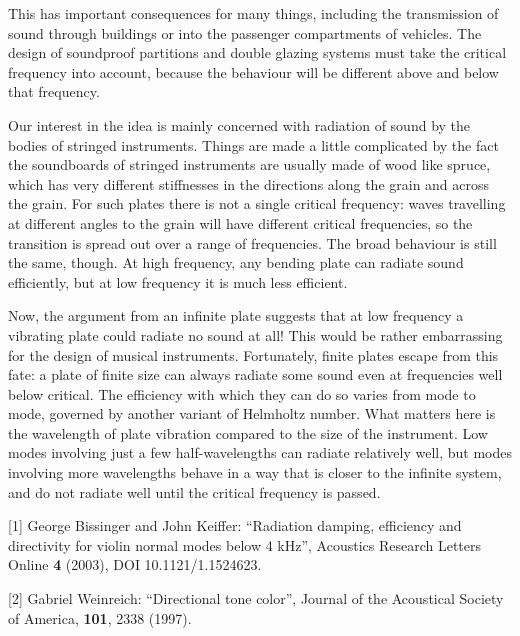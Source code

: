   This has important consequences for many things, including the transmission 
  of sound through buildings or into the passenger compartments of vehicles. 
  The design of soundproof partitions and double glazing systems must take the 
  critical frequency into account, because the behaviour will be different 
  above and below that frequency. 

  Our interest in the idea is mainly concerned with radiation of sound by the 
  bodies of stringed instruments. Things are made a little complicated by the 
  fact the soundboards of stringed instruments are usually made of wood like 
  spruce, which has very different stiffnesses in the directions along the 
  grain and across the grain. For such plates there is not a single critical 
  frequency: waves travelling at different angles to the grain will have 
  different critical frequencies, so the transition is spread out over a range 
  of frequencies. The broad behaviour is still the same, though. At high 
  frequency, any bending plate can radiate sound efficiently, but at low 
  frequency it is much less efficient. 

  Now, the argument from an infinite plate suggests that at low frequency a 
  vibrating plate could radiate no sound at all! This would be rather 
  embarrassing for the design of musical instruments. Fortunately, finite 
  plates escape from this fate: a plate of finite size can always radiate some 
  sound even at frequencies well below critical. The efficiency with which they 
  can do so varies from mode to mode, governed by another variant of Helmholtz 
  number. What matters here is the wavelength of plate vibration compared to 
  the size of the instrument. Low modes involving just a few half-wavelengths 
  can radiate relatively well, but modes involving more wavelengths behave in a 
  way that is closer to the infinite system, and do not radiate well until the 
  critical frequency is passed. 



  \sectionreferences{}[1] George Bissinger and John Keiffer: ``Radiation 
  damping, efficiency and directivity for violin normal modes below 4 kHz'', 
  Acoustics Research Letters Online \textbf{4} (2003), DOI 10.1121/1.1524623. 

  [2] Gabriel Weinreich: ``Directional tone color'', Journal of the Acoustical 
  Society of America, \textbf{101}, 2338 (1997). 